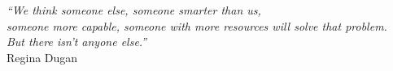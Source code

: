 \cleardoublepage
\thispagestyle{plain}

\vspace*{8cm}

\begin{flushright}
   \textsl{``We think someone else, someone smarter than us,\\someone more capable, someone with more resources will solve that problem.\\But there isn't anyone else.''} \\
\vspace*{1.5cm}
            Regina Dugan
\end{flushright}
